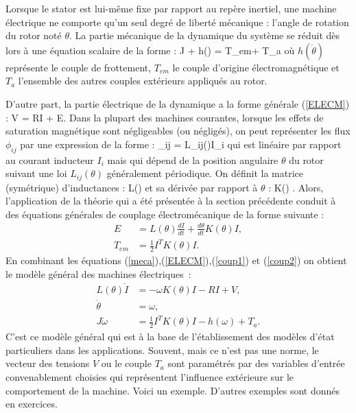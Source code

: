 Lorsque le stator est lui-même fixe par rapport au repère
inertiel, une machine électrique ne comporte qu'un seul degré de
liberté mécanique : l'angle de rotation du rotor noté $\theta$. 
La partie mécanique de la dynamique du système se
réduit dès lors à une équation scalaire de la forme :
\eqn \label{meca}
J \ddot \theta + h(\dot \theta) = T_{em}+ T_a 
\eeqn
où $h(\dot \theta)$ représente le couple de frottement, $T_{em}$ le
couple d'origine électromagnétique et $T_a$ l'ensemble des autres couples
extérieurs appliqués au rotor.

D'autre part, la partie électrique de la dynamique a la
forme générale (\ref{ELECM}) :
\eqnn
V = RI + E. 
\eeqnn
Dans la plupart des machines courantes, lorsque les effets de saturation
magnétique sont négligeables (ou négligés), on peut représenter les flux
$\phi_{ij}$ par une expression de la forme : 
\eqnn
\phi_{ij} = L_{ij}(\theta)I_i
\eeqnn
qui est linéaire par rapport au courant inducteur $I_i$ mais qui dépend
de la position angulaire $\theta$ du rotor suivant une loi
$L_{ij}(\theta)$ généralement périodique. On définit la
matrice (symétrique) d'inductances :
\eqnn
L(\theta) \triangleq [L_{ij}(\theta)]
\eeqnn
et sa dérivée par rapport à $\theta$ :
\eqnn
K(\theta) \triangleq {}.
\eeqnn
Alors, l'application de la théorie qui a été présentée à la section
précédente conduit à des équations générales de couplage
électromécanique de la forme suivante :
\begin{align}
E &= L(\theta)\frac{dI}{dt} + \frac{d\theta}{dt}K(\theta)I, \label{coup1}\\
T_{em} &= \frac{1}{2}I^TK(\theta)I. \label{coup2}
\end{align}
En combinant les équations (\ref{meca}),(\ref{ELECM}),(\ref{coup1}) et (\ref{coup2}) on obtient le modèle général des machines électriques~:
\begin{equation*} \begin{split}
L(\theta)\dot I &= - \omega K(\theta) I - RI + V, \\
\dot \theta &= \omega, \\
J \dot \omega &= \frac{1}{2} I^TK(\theta)I - h(\omega) + T_a.
\end{split} \end{equation*}
C'est ce modèle général qui est à la base de l'établissement des modèles d'état particuliers dans les applications. Souvent, mais ce n'est pas une norme, le vecteur des tensions $V$ ou le couple $T_a$ sont paramétrés par des variables d'entrée convenablement choisies qui représentent l'influence extérieure sur le comportement de la machine.
Voici un exemple. D'autres exemples sont donnés en exercices.

